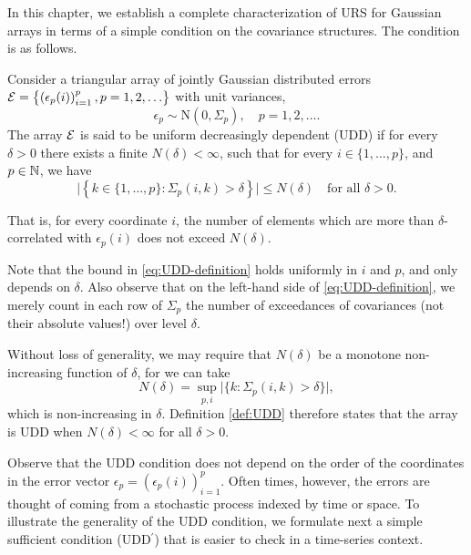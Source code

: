 
In this chapter, we establish a complete characterization of URS for Gaussian arrays in terms of a simple condition on the covariance structures.
The condition is as follows.



\begin{definition} \label{def:UDD}
Consider a triangular array of jointly Gaussian distributed errors 
${\cal E} = \left\{\left(\epsilon_p(i)\right)_{i=1}^p, p = 1,2,\ldots\right\}$ 
with unit variances,
$$
\epsilon_p \sim \text{N}(0, \Sigma_p), \quad p=1,2,\ldots.
$$
The array ${\cal E}$ is said to be uniform decreasingly dependent (UDD) if 
for every $\delta>0$ there exists a finite $N(\delta)<\infty$, such that for every $i\in\{1,\ldots,p\}$, and $p\in\mathbb N$, we have
\begin{equation} \label{eq:UDD-definition}
    \Big|\left\{k\in\{1,\ldots,p\}:\Sigma_p(i,k)>\delta\right\}\Big| \le N(\delta)\quad \text{for all  } \delta>0.
\end{equation}
\end{definition}
That is, for every coordinate $i$, the number of elements which are more than $\delta$-correlated with $\epsilon_p(i)$ does not exceed $N(\delta)$. 

Note that the bound in \eqref{eq:UDD-definition} holds uniformly in $i$ and $p$, and only depends on $\delta$.
Also observe that on the left-hand side of \eqref{eq:UDD-definition}, we merely count in each row of $\Sigma_p$ the number of exceedances of covariances (not their absolute values!) over level $\delta$.

\begin{remark} \label{rmk:choice-of-N(delta)}
Without loss of generality, we may require that $N(\delta)$ be a monotone non-increasing function of $\delta$, for we can take
$$
N(\delta) = \sup_{p,i} \Big|\{k:\Sigma_p(i,k)>\delta\}\Big|,
$$
which is non-increasing in $\delta$.
Definition \ref{def:UDD} therefore states that the array is UDD when $N(\delta)<\infty$ for all $\delta>0$.
\end{remark}


Observe that the UDD condition does not depend on the order of the coordinates in the error 
vector $\epsilon_p = (\epsilon_p(i))_{i=1}^p$.  Often times, however, the errors are thought of 
coming from a stochastic process indexed by time or space.  To illustrate the generality of the 
UDD condition, we formulate next a simple sufficient condition (UDD$^\prime$) that is easier to 
check in a time-series context.

